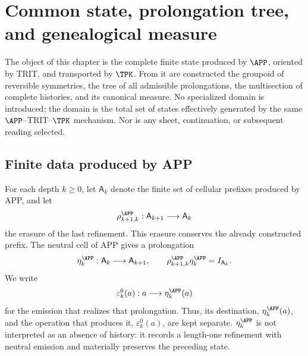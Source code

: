 \chapter{Common state, prolongation tree, and genealogical measure}
\label{chap:continuo-estado-arbol-medida-comun}

\begin{thesisbox}[title={A single enriched state prior to any internal discrimination}]
The object of this chapter is the complete finite state produced by \(\APP\), oriented by TRIT, and transported by \(\TPK\). From it are constructed the groupoid of reversible symmetries, the tree of all admissible prolongations, the multisection of complete histories, and its canonical measure. No specialized domain is introduced: the domain is the total set of states effectively generated by the same \(\APP\)--TRIT--\(\TPK\) mechanism. Nor is any sheet, continuation, or subsequent reading selected.
\end{thesisbox}

\section{Finite data produced by APP}
\label{sec:continuo-comun-app-finito}

For each depth \(k\geq0\), let \(\mathsf A_k\) denote the finite set
of cellular prefixes produced by APP, and let
\begin{equation}
\label{eq:continuo-comun-app-truncamiento}
 \rho^{\APP}_{k+1,k}:\mathsf A_{k+1}\longrightarrow\mathsf A_k
\end{equation}
the erasure of the last refinement.  This erasure conserves the already
constructed prefix.  The neutral cell of APP gives a prolongation
\begin{equation}
\label{eq:continuo-comun-app-degeneracion}
 \eta^{\APP}_k:\mathsf A_k\longrightarrow\mathsf A_{k+1},
 \qquad
 \rho^{\APP}_{k+1,k}\eta^{\APP}_k=I_{\mathsf A_k}.
\end{equation}
We write
\begin{equation}
\label{eq:continuo-comun-emision-neutra-app}
 \varepsilon^0_k(a):a\longrightarrow\eta^{\APP}_k(a)
\end{equation}
for the emission that realizes that prolongation. Thus, its
destination, \(\eta^{\APP}_k(a)\), and the operation that produces it,
\(\varepsilon^0_k(a)\), are kept separate.
\(\eta^{\APP}_k\) is not interpreted as an absence of history: it records a
length-one refinement with neutral emission and materially preserves the
preceding state.

